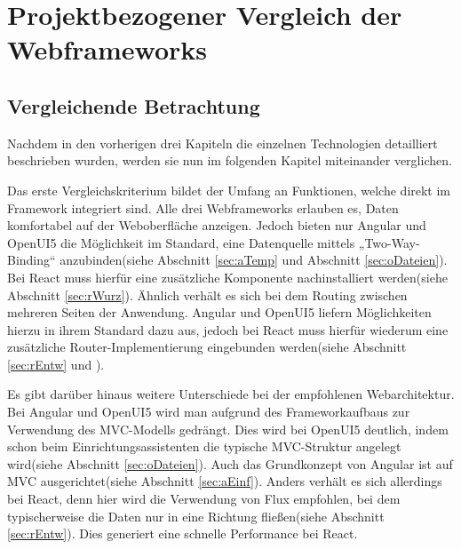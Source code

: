 

\chapter{Projektbezogener Vergleich der Webframeworks}
\section{Vergleichende Betrachtung}\label{sec:vergl}

Nachdem in den vorherigen drei Kapiteln die einzelnen Technologien detailliert beschrieben wurden, werden sie nun im folgenden Kapitel miteinander verglichen.

Das erste Vergleichskriterium bildet der Umfang an Funktionen, welche direkt im Framework integriert sind. Alle drei Webframeworks erlauben es, Daten komfortabel auf der Weboberfläche anzeigen. Jedoch bieten nur Angular und OpenUI5 die Möglichkeit im Standard, eine Datenquelle mittels „Two-Way-Binding“ anzubinden(siehe Abschnitt \ref{sec:aTemp} und Abschnitt \ref{sec:oDateien}). Bei React muss hierfür eine zusätzliche Komponente nachinstalliert werden(siehe Abschnitt \ref{sec:rWurz}). Ähnlich verhält es sich bei dem Routing zwischen mehreren Seiten der Anwendung. Angular und OpenUI5 liefern Möglichkeiten hierzu in ihrem Standard dazu aus, jedoch bei React muss hierfür wiederum eine zusätzliche Router-Implementierung eingebunden werden(siehe Abschnitt \ref{sec:rEntw} und \autocites[vgl.][8]{Zeigermann.2016}). 

Es gibt darüber hinaus weitere Unterschiede bei der empfohlenen Webarchitektur. Bei Angular und OpenUI5 wird man aufgrund des Frameworkaufbaus zur Verwendung des MVC-Modells gedrängt. Dies wird bei OpenUI5 deutlich, indem schon beim Einrichtungsassistenten die typische MVC-Struktur angelegt wird(siehe Abschnitt \ref{sec:oDateien}). Auch das Grundkonzept von Angular ist auf MVC ausgerichtet(siehe Abschnitt \ref{sec:aEinf}). Anders verhält es sich allerdings bei React, denn hier wird die Verwendung von Flux empfohlen, bei dem typischerweise die Daten nur in eine Richtung fließen(siehe Abschnitt \ref{sec:rEntw}). Dies generiert eine schnelle Performance bei React.

